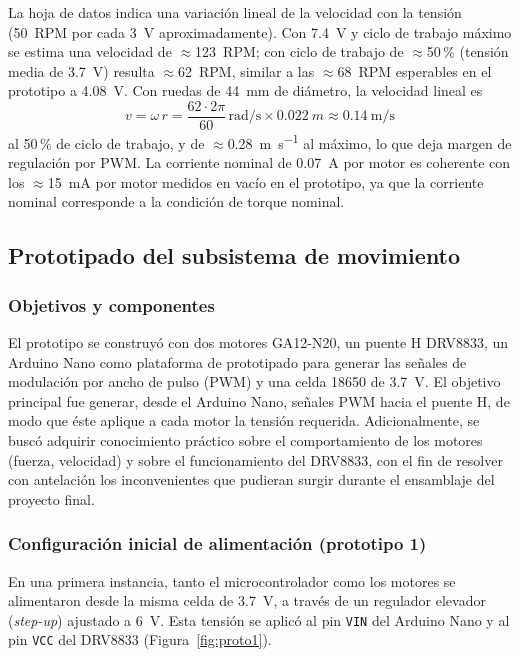 \begin{visar}
La hoja de datos indica una variación lineal de la velocidad con la tensión (\SI{50}{RPM} por cada \SI{3}{V} aproximadamente). Con \SI{7,4}{V} y ciclo de trabajo máximo se estima una velocidad de $\approx$\SI{123}{RPM}; con ciclo de trabajo de $\approx$50\,\% (tensión media de \SI{3,7}{V}) resulta $\approx$\SI{62}{RPM}, similar a las $\approx$\SI{68}{RPM} esperables en el prototipo a \SI{4,08}{V}. Con ruedas de \SI{44}{mm} de diámetro, la velocidad lineal es
\begin{equation*}
v = \omega\, r = \frac{62 \cdot 2\pi}{60}\,\si{\radian\per\second} \times \SI{0,022}{m} \approx \SI{0,14}{\meter\per\second}
\end{equation*}
al 50\,\% de ciclo de trabajo, y de $\approx$\SI{0,28}{\meter\per\second} al máximo, lo que deja margen de regulación por PWM. La corriente nominal de \SI{0,07}{A} por motor es coherente con los $\approx$\SI{15}{mA} por motor medidos en vacío en el prototipo, ya que la corriente nominal corresponde a la condición de torque nominal.
\end{visar}

\subsection{Prototipado del subsistema de movimiento}
\subsubsection{Objetivos y componentes}
El prototipo se construyó con dos motores GA12-N20, un puente H DRV8833, un Arduino Nano como plataforma de prototipado para generar las señales de modulación por ancho de pulso (PWM) y una celda 18650 de \SI{3,7}{V}. El objetivo principal fue generar, desde el Arduino Nano, señales PWM hacia el puente H, de modo que éste aplique a cada motor la tensión requerida. Adicionalmente, se buscó adquirir conocimiento práctico sobre el comportamiento de los motores (fuerza, velocidad) y sobre el funcionamiento del DRV8833, con el fin de resolver con antelación los inconvenientes que pudieran surgir durante el ensamblaje del proyecto final.

\subsubsection{Configuración inicial de alimentación (prototipo 1)}
En una primera instancia, tanto el microcontrolador como los motores se alimentaron desde la misma celda de \SI{3,7}{V}, a través de un regulador elevador (\emph{step-up}) ajustado a \SI{6}{V}. Esta tensión se aplicó al pin \texttt{VIN} del Arduino Nano y al pin \texttt{VCC} del DRV8833 (Figura~\ref{fig:proto1}).


